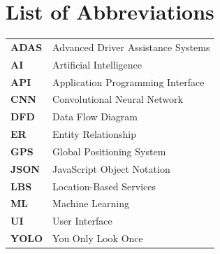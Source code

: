 \chapter*{List of Abbreviations}
\begin{singlespace}
\begin{longtable}{p{3cm} p{10.3cm}}

\textbf{ADAS} & Advanced Driver Assistance Systems\\[3pt]
\textbf{AI} & Artificial Intelligence\\[3pt]
\textbf{API} & Application Programming Interface\\[3pt]
\textbf{CNN} & Convolutional Neural Network\\[3pt]
\textbf{DFD} & Data Flow Diagram\\[3pt]
\textbf{ER} & Entity Relationship\\[3pt]
\textbf{GPS} & Global Positioning System\\[3pt]
\textbf{JSON} & JavaScript Object Notation\\[3pt]
\textbf{LBS} & Location-Based Services\\[3pt]
\textbf{ML} & Machine Learning\\[3pt]
\textbf{UI} & User Interface\\[3pt]
\textbf{YOLO} & You Only Look Once\\

\end{longtable}
\end{singlespace}